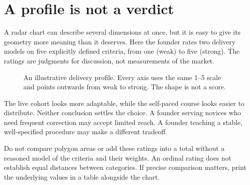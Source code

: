 \documentclass[11pt,twoside,openright]{book}
\begin{document}
\section{A profile is not a verdict}
A radar chart can describe several dimensions at once, but it is easy to give
its geometry more meaning than it deserves. Here the founder rates two delivery
models on five explicitly defined criteria, from one (weak) to five (strong).
The ratings are judgments for discussion, not measurements of the market.

\begin{figure}[H]
\centering
{}
\par{}
\caption{An illustrative delivery profile. Every axis uses the same 1--5
scale and points outwards from weak to strong. The shape is not a score.}
\end{figure}

The live cohort looks more adaptable, while the self-paced course looks easier
to distribute. Neither conclusion settles the choice. A founder serving novices
who need frequent correction may accept limited reach. A founder teaching a
stable, well-specified procedure may make a different tradeoff.

Do not compare polygon areas or add these ratings into a total without a
reasoned model of the criteria and their weights. An ordinal rating does not
establish equal distances between categories. If precise comparison matters,
print the underlying values in a table alongside the chart.
\end{document}
